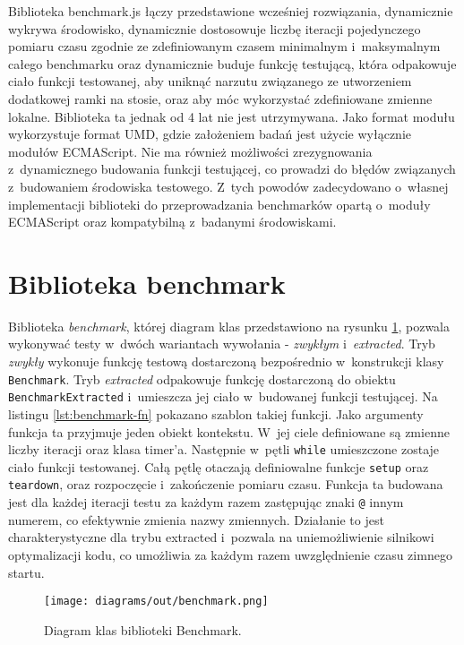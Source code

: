 Biblioteka benchmark.js łączy przedstawione wcześniej rozwiązania, dynamicznie wykrywa środowisko, dynamicznie dostosowuje liczbę iteracji pojedynczego pomiaru czasu zgodnie ze zdefiniowanym czasem minimalnym i~maksymalnym całego benchmarku oraz dynamicznie buduje funkcję testującą, która odpakowuje ciało funkcji testowanej, aby uniknąć narzutu związanego ze utworzeniem dodatkowej ramki na stosie, oraz aby móc wykorzystać zdefiniowane zmienne lokalne. Biblioteka ta jednak od 4 lat nie jest utrzymywana. Jako format modułu wykorzystuje format UMD, gdzie założeniem badań jest użycie wyłącznie modułów ECMAScript. Nie ma również możliwości zrezygnowania z~dynamicznego budowania funkcji testującej, co prowadzi do błędów związanych z~budowaniem środowiska testowego. Z~tych powodów zadecydowano o~własnej implementacji biblioteki do przeprowadzania benchmarków opartą o~moduły ECMAScript oraz kompatybilną z~badanymi środowiskami.

\section{Biblioteka benchmark}
\label{sec:benchmark}

Biblioteka \textit{benchmark}, której diagram klas przedstawiono na rysunku \ref{fig:benchmark-puml}, pozwala wykonywać testy w~dwóch wariantach wywołania - \textit{zwykłym} i~\textit{extracted}. Tryb \textit{zwykły} wykonuje funkcję testową dostarczoną bezpośrednio w~konstrukcji klasy \lstinline{Benchmark}. Tryb \textit{extracted} odpakowuje funkcję dostarczoną do obiektu \lstinline{BenchmarkExtracted} i~umieszcza jej ciało w~budowanej funkcji testującej. Na listingu \ref{lst:benchmark-fn} pokazano szablon takiej funkcji. Jako argumenty funkcja ta przyjmuje jeden obiekt kontekstu. W~jej ciele definiowane są zmienne liczby iteracji oraz klasa timer'a. Następnie w~pętli \lstinline{while} umieszczone zostaje ciało funkcji testowanej. Całą pętlę otaczają definiowalne funkcje \lstinline{setup} oraz \lstinline{teardown}, oraz rozpoczęcie i~zakończenie pomiaru czasu. Funkcja ta budowana jest dla każdej iteracji testu za każdym razem zastępując znaki \lstinline{@} innym numerem, co efektywnie zmienia nazwy zmiennych. Działanie to jest charakterystyczne dla trybu extracted i~pozwala na uniemożliwienie silnikowi optymalizacji kodu, co umożliwia za każdym razem uwzględnienie czasu zimnego startu.

\begin{figure}
  \centering
  \texttt{[image: diagrams/out/benchmark.png]}
  \caption{Diagram klas biblioteki Benchmark.}
  \label{fig:benchmark-puml}
\end{figure}
\clearpage


